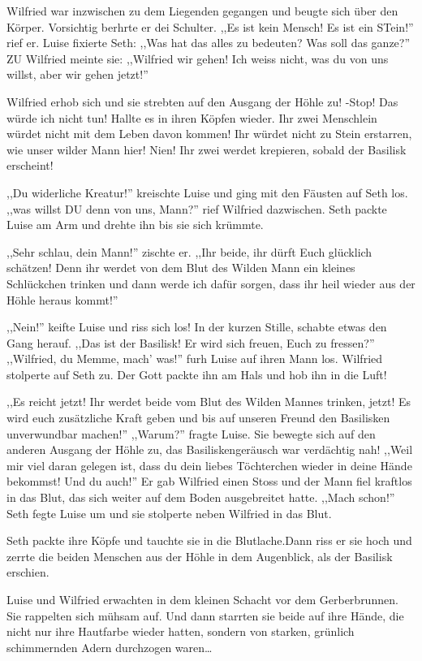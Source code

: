 Wilfried war inzwischen zu dem Liegenden gegangen und beugte sich über den Körper. Vorsichtig berhrte er dei Schulter. ,,Es ist kein Mensch! Es ist ein STein!'' rief er. Luise fixierte Seth: ,,Was hat das alles zu bedeuten? Was soll das ganze?'' ZU Wilfried meinte sie: ,,Wilfried wir gehen! Ich weiss nicht, was du von uns willst, aber wir gehen jetzt!''

Wilfried erhob sich und sie strebten auf den Ausgang der Höhle zu! -Stop! Das würde ich nicht tun! Hallte es in ihren Köpfen wieder. Ihr zwei Menschlein würdet nicht mit dem Leben davon kommen! Ihr würdet nicht zu Stein erstarren, wie unser wilder Mann hier! Nien! Ihr zwei werdet krepieren, sobald der Basilisk erscheint!

,,Du widerliche Kreatur!'' kreischte Luise und ging mit den Fäusten auf Seth los. ,,was willst DU denn von uns, Mann?'' rief Wilfried dazwischen. Seth packte Luise am Arm und drehte ihn bis sie sich krümmte.

,,Sehr schlau, dein Mann!'' zischte er. ,,Ihr beide, ihr dürft Euch glücklich schätzen! Denn ihr werdet von dem Blut des Wilden Mann ein kleines Schlückchen trinken und dann werde ich dafür sorgen, dass ihr heil wieder aus der Höhle heraus kommt!''

,,Nein!'' keifte Luise und riss sich los!
In der kurzen Stille, schabte etwas den Gang herauf. ,,Das ist der Basilisk! Er wird sich freuen, Euch zu fressen?'' ,,Wilfried, du Memme, mach' was!'' furh Luise auf ihren Mann los. Wilfried stolperte auf Seth zu. Der Gott packte ihn am Hals und hob ihn in die Luft!

,,Es reicht jetzt! Ihr werdet beide vom Blut des Wilden Mannes trinken, jetzt! Es wird euch zusätzliche Kraft geben und bis auf unseren Freund den Basilisken unverwundbar machen!'' ,,Warum?'' fragte Luise. Sie bewegte sich auf den anderen Ausgang der Höhle zu, das Basiliskengeräusch war verdächtig  nah! ,,Weil mir viel daran gelegen ist, dass du dein liebes Töchterchen wieder in deine Hände bekommst! Und du auch!'' Er gab Wilfried einen Stoss und der Mann fiel kraftlos in das Blut, das sich weiter auf dem Boden ausgebreitet hatte. ,,Mach schon!'' Seth fegte Luise um und sie stolperte neben Wilfried in das Blut.

Seth packte ihre Köpfe und tauchte sie in die Blutlache.Dann riss er sie hoch und zerrte die beiden Menschen aus der Höhle in dem Augenblick, als der Basilisk erschien.

\sterne

Luise und Wilfried erwachten in dem kleinen Schacht vor dem Gerberbrunnen. Sie rappelten sich mühsam auf. Und dann starrten sie beide auf ihre Hände, die nicht nur ihre Hautfarbe wieder hatten, sondern von starken, grünlich schimmernden Adern durchzogen waren\dots

